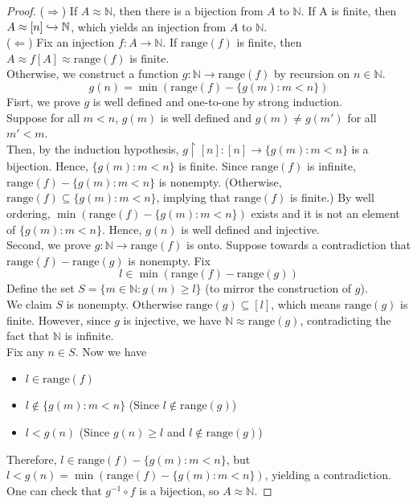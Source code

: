 \documentclass[14pt]{article}
\theoremstyle{definition}
\newcommand{\fun}[3]{#1\colon #2\rightarrow#3}
\newcommand{\bb}[1]{\mathbb{#1}}
\newcommand{\restrict}{\upharpoonright}
\begin{document}
\begin{proof}
    ($\Rightarrow$) If $A\approx \bb{N}$, then there is a bijection from $A$ to $\bb{N}$.
    If A is finite, then $A\approx [n]\xhookrightarrow{}\bb{N}$, which yields an injection from $A$ to $\bb{N}$.\\
    ($\Leftarrow$) Fix an injection $\fun{f}{A}{\bb{N}}$. If $\mathrm{range}(f)$ is finite, then $A\approx f[A]\approx \mathrm{range}(f)$ is finite.\\
    Otherwise, we construct a function $\fun{g}{\bb{N}}{\mathrm{range}(f)}$ by recursion on $n\in\bb{N}$.
    \begin{equation*}
        g(n)=\min (\mathrm{range}(f)-\{g(m)\colon m<n\})
    \end{equation*}
    Fisrt, we prove $g$ is well defined and one-to-one by strong induction.\\
    Suppose for all $m<n$, $g(m)$ is well defined and $g(m)\not= g(m')$ for all $m'<m$.\\
    Then, by the induction hypothesis,  $g\restrict [n]\colon [n]\rightarrow \{g(m)\colon m<n\} $ is a bijection. Hence,  $\{g(m)\colon m<n\}$ is finite.
    Since $\mathrm{range}(f)$ is infinite, $\mathrm{range}(f)-\{g(m)\colon m<n\}$ is nonempty. (Otherwise, 
    $\mathrm{range}(f)\subseteq\{g(m)\colon m<n\}$, implying that $\mathrm{range}(f)$ is finite.)
    By well ordering, $\min (\mathrm{range}(f)-\{g(m)\colon m<n\})$ exists and it is not an element of $\{g(m)\colon m<n\}$.
    Hence, $g(n)$ is well defined and injective.\\
    Second, we prove $\fun{g}{\bb{N}}{\mathrm{range}(f)}$ is onto. Suppose towards a contradiction 
    that $\mathrm{range}(f)-\mathrm{range}(g)$ is nonempty. Fix 
    \begin{equation*}
        l\in \min(\mathrm{range}(f)-\mathrm{range}(g))
    \end{equation*}
    Define the set $S=\{m\in\bb{N}\colon g(m)\geq l\}$ (to mirror the construction of $g$).\\
    We claim $S$ is nonempty. Otherwise $\mathrm{range}(g)\subseteq[l]$, which means $\mathrm{range}(g)$
    is finite. However, since $g$ is injective, we have $\bb{N}\approx \mathrm{range}(g)$, contradicting the 
    fact that $\bb{N}$ is infinite.\\
    Fix any $n\in S$. Now we have
    \begin{itemize}
        \item $l\in\mathrm{range}(f)$
        \item $l\not\in\{g(m)\colon m<n\}$ (Since $l\not\in \mathrm{range}(g)$)
        \item  $l< g(n)$ (Since $g(n)\geq l $ and $l\not\in \mathrm{range}(g)$)
    \end{itemize}
    Therefore, $l\in\mathrm{range}(f)-\{g(m)\colon m<n\}$, but $l<g(n)=\min(\mathrm{range}(f)-\{g(m)\colon m<n\}) $, yielding a contradiction.\\
    One can check that $g^{-1}\circ f$ is a bijection, so $A\approx \bb{N}$. 

\end{proof}
\end{document}
